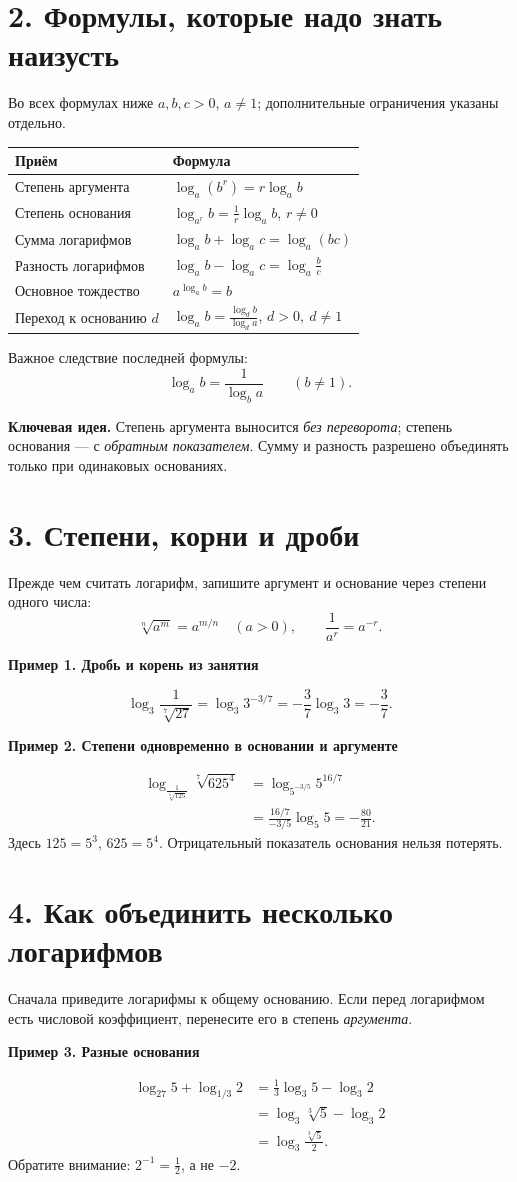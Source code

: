 \documentclass[a4paper,11pt]{article}
\newcommand{\idea}[1]{\par\textcolor{darkaccent}{\textbf{Ключевая идея.}} #1\par}
\newcommand{\namedexample}[1]{\par\medskip\textbf{#1}\par\vspace{-2mm}}
\begin{document}
\section*{2. Формулы, которые надо знать наизусть}
Во всех формулах ниже \(a,b,c>0\), \(a\ne1\); дополнительные ограничения указаны отдельно.
\renewcommand{\arraystretch}{1.42}
\begin{tabularx}{\linewidth}{@{}>{\raggedright\arraybackslash}p{.31\linewidth}X@{}}
\toprule
\textbf{Приём} & \textbf{Формула}\tabularnewline
\midrule
Степень аргумента & \(\displaystyle \log_a(b^r)=r\log_a b\)\tabularnewline
Степень основания & \(\displaystyle \log_{a^r}b=\frac1r\log_a b\), \(r\ne0\)\tabularnewline
Сумма логарифмов & \(\displaystyle \log_a b+\log_a c=\log_a(bc)\)\tabularnewline
Разность логарифмов & \(\displaystyle \log_a b-\log_a c=\log_a\frac bc\)\tabularnewline
Основное тождество & \(\displaystyle a^{\log_a b}=b\)\tabularnewline
Переход к основанию \(d\) & \(\displaystyle \log_a b=\frac{\log_d b}{\log_d a}\), \(d>0,\ d\ne1\)\tabularnewline
\bottomrule
\end{tabularx}

\vspace{1mm}
Важное следствие последней формулы:
\[
\boxed{\log_a b=\frac{1}{\log_b a}\qquad(b\ne1).}
\]
\idea{Степень аргумента выносится \emph{без переворота}; степень основания --- с \emph{обратным показателем}. Сумму и разность разрешено объединять только при одинаковых основаниях.}

\section*{3. Степени, корни и дроби}
Прежде чем считать логарифм, запишите аргумент и основание через степени одного числа:
\[
\sqrt[n]{a^m}=a^{m/n}\quad(a>0),\qquad
\frac1{a^r}=a^{-r}.
\]
\namedexample{Пример 1. Дробь и корень из занятия}
\[
\log_3\frac{1}{\sqrt[7]{27}}
=\log_3 3^{-3/7}
=-\frac37\log_3 3=\boxed{-\frac37}.
\]
\namedexample{Пример 2. Степени одновременно в основании и аргументе}
\[
\begin{aligned}
\log_{\frac{1}{\sqrt[5]{125}}}\sqrt[7]{625^4}
&=\log_{5^{-3/5}}5^{16/7}\\
&=\frac{16/7}{-3/5}\log_5 5
=\boxed{-\frac{80}{21}}.
\end{aligned}
\]
Здесь \(125=5^3\), \(625=5^4\). Отрицательный показатель основания нельзя потерять.

\section*{4. Как объединить несколько логарифмов}
Сначала приведите логарифмы к общему основанию. Если перед логарифмом есть числовой коэффициент, перенесите его в степень \emph{аргумента}.
\namedexample{Пример 3. Разные основания}
\[
\begin{aligned}
\log_{27}5+\log_{1/3}2
&=\frac13\log_3 5-\log_3 2\\
&=\log_3\sqrt[3]{5}-\log_3 2\\
&=\boxed{\log_3\frac{\sqrt[3]{5}}2}.
\end{aligned}
\]
Обратите внимание: \(2^{-1}=\frac12\), а не \(-2\).
\end{document}

